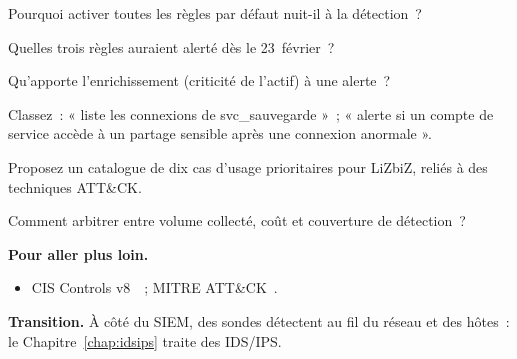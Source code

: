 \begin{boxexo}[title={\ding{45}\quad Exercice~5.5. Bruit \niveaumoyen}]
Pourquoi activer toutes les règles par défaut nuit-il à la détection~?
\end{boxexo}

\begin{boxexo}[title={\ding{45}\quad Exercice~5.6. BÉNOUÉ \niveaumoyen}]
Quelles trois règles auraient alerté dès le 23~février~?
\end{boxexo}

\begin{boxexo}[title={\ding{45}\quad Exercice~5.7. Enrichissement \niveaumoyen}]
Qu'apporte l'enrichissement (criticité de l'actif) à une alerte~?
\end{boxexo}

\begin{boxexo}[title={\ding{45}\quad Exercice~5.8. Chercher ou corréler \niveaumoyen}]
Classez~: « liste les connexions de svc\_sauvegarde »~; « alerte si un compte
de service accède à un partage sensible après une connexion anormale ».
\end{boxexo}

\begin{boxexo}[title={\ding{45}\quad Exercice~5.9. Catalogue \niveauexpert}]
Proposez un catalogue de dix cas d'usage prioritaires pour LiZbiZ, reliés à
des techniques ATT\&CK.
\end{boxexo}

\begin{boxexo}[title={\ding{45}\quad Exercice~5.10. Dimensionnement \niveauexpert}]
Comment arbitrer entre volume collecté, coût et couverture de détection~?
\end{boxexo}

\bigskip

\begin{boxinfo}
\textbf{Pour aller plus loin.}
\begin{itemize}
    \item CIS Controls v8~\cite{cis2021controls}~; MITRE ATT\&CK~\cite{mitreattack}.
\end{itemize}
\end{boxinfo}

\begin{boxinfo}
\textbf{Transition.} À côté du SIEM, des sondes détectent au fil du réseau et
des hôtes~: le Chapitre~\ref{chap:idsips} traite des IDS/IPS.
\end{boxinfo}
